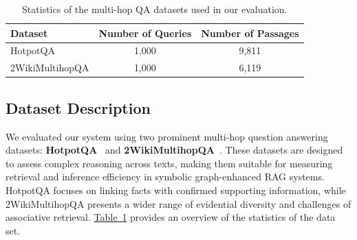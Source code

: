 \documentclass[runningheads]{llncs}
\begin{document}
\vspace{-12pt} %
\begin{table}[htb]
    \centering
    \caption{Statistics of the multi-hop QA datasets used in our evaluation.}
    \label{tab:dataset_stats}
    \begin{tabular}{|l|c|c|}
        \hline
        \textbf{Dataset} & \textbf{Number of Queries} & \textbf{Number of Passages} \\
        \hline
        HotpotQA & 1,000 & 9,811 \\
        2WikiMultihopQA & 1,000 & 6,119 \\
        \hline
    \end{tabular}
\end{table}
\vspace{-20pt} %

\subsection{Dataset Description}
\noindent
We evaluated our system using two prominent multi-hop question answering datasets: \textbf{HotpotQA}~\cite{yang2018hotpotqa} and \textbf{2WikiMultihopQA}~\cite{ho2020constructing}. These datasets are designed to assess complex reasoning across texts, making them suitable for measuring retrieval and inference efficiency in symbolic graph-enhanced RAG systems. HotpotQA focuses on linking facts with confirmed supporting information, while 2WikiMultihopQA presents a wider range of evidential diversity and challenges of associative retrieval. {\hypersetup{linkcolor=softblue}\hyperref[tab:dataset_stats]{Table~\ref*{tab:dataset_stats}}} provides an overview of the statistics of the data set.
\end{document}
